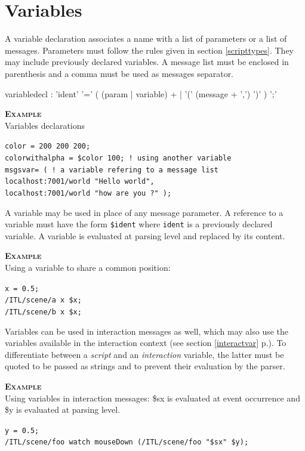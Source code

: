 \documentclass[a4paper,twoside]{report}
\newcommand{\sublevel}[1]	{\section{#1}}
\newcommand{\fullref}[1]	{\ref{#1} p.\pageref{#1}}
\newcommand{\OSC}[1]		{\texttt{#1}}
\newcommand{\example}		{\textbf{\hspace{-1.5cm}\textbf{\textsc{Example }}}}
\newcommand{\sample}	[1]			{\vspace{-2mm}\begin{center}\colorbox{mygrey}{
								\begin{minipage}[t]{0.9\columnwidth} 
								{\small \texttt{#1}}
								\end{minipage}}\end{center}}
\begin{document}
\sublevel{Variables}\label{scriptvar}

A variable declaration associates a name with a list of parameters or a list of messages.
Parameters must follow the rules given in section \ref{scripttypes}. They may include previously declared variables. A message list must be enclosed in parenthesis and a comma must be used as messages separator.
\begin{rail} 
variabledecl : 'ident' '=' ( (param | variable) +
					| '(' (message + ',') ')' ) ';'
\end{rail}

\example \\
Variables declarations
\sample{color = 200 200 200; \\
colorwithalpha = \$color 100; ! using another variable \\
msgsvar= ( \hspace*{2.7cm}  ! a variable refering to a message list \\
\hspace*{1cm} localhost:7001/world "Hello world", \\
\hspace*{1cm} localhost:7001/world "how are you ?" );
}


A variable may be used in place of any message parameter. A reference to a variable must have the form \OSC{\$ident} where \OSC{ident} is a previously declared variable. A variable is evaluated at parsing level and replaced by its content.

\example \\
Using a variable to share a common position:
\sample{x = 0.5;\\
/ITL/scene/a x \$x;\\
/ITL/scene/b x \$x;
}

Variables can be used in interaction messages as well, which may also use the variables available in the interaction context (see section \fullref{interactvar}). To differentiate between a \emph{script} and an \emph{interaction} variable, the latter must be quoted to be passed as strings and to prevent their evaluation by the parser. 

\example \\
Using variables in interaction messages: \$sx is evaluated at event occurrence	and \$y is evaluated at parsing level.
\sample{y = 0.5;\\
/ITL/scene/foo watch mouseDown (/ITL/scene/foo "\$sx" \$y);
}
\end{document}

